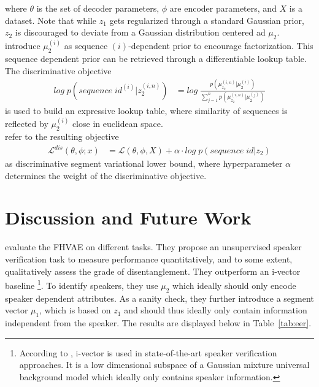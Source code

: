 \documentclass{article} %
\begin{document}
where $\theta$ is the set of decoder parameters, $\phi$ are encoder parameters, and $X$ is a dataset. Note that while $z_1$ gets regularized through a standard Gaussian prior, $z_2$ is discouraged to deviate from a Gaussian distribution centered ad $\mu_2$. \citet{hsu2017unsupervised} introduce $\mu_{2}^{(i)}$ as sequence $(i)$-dependent prior to encourage factorization. This sequence dependent prior can be retrieved through a differentiable lookup table. The discriminative objective 
\begin{align*}
log\;p(sequence\;id^{(i)} | z_2^{(i,n)})& = log\;\frac{p(\mu_{z_2}^{(i,n)}|\mu_2^{(i)})}{\sum^{n}_{j=1}	p(\mu_{z_2}^{(i,n)}|\mu_2^{(j)})}
\end{align*}
is used to build an expressive lookup table, where similarity of sequences is reflected by $\mu_{2}^{(i)}$ close in euclidean space.\\
\citet{hsu2017unsupervised} refer to the resulting objective
\begin{align*}
\mathcal{L}^{dis}(\theta, \phi;x)& = \mathcal{L}(\theta, \phi, X) + \alpha \cdot log\;p(sequence\;id | z_2)
\end{align*}
as discriminative segment variational lower bound, where hyperparameter $\alpha$ determines the weight of the discriminative objective.




\section*{Discussion and Future Work}
\citet{hsu2017unsupervised} evaluate the FHVAE on different tasks. They propose an unsupervised speaker verification task to measure performance quantitatively, and to some extent, qualitatively assess the grade of disentanglement. They outperform an i-vector baseline \footnote{According to \citet{hsu2017unsupervised}, i-vector is used in state-of-the-art speaker verification approaches. It is a low dimensional subspace of a Gaussian mixture universal background model which ideally only contains speaker information.}. To identify speakers, they use $\mu_2$ which ideally should only encode speaker dependent attributes. As a sanity check, they further introduce a segment vector $\mu_1$, which is based on $z_1$ and should thus ideally only contain information independent from the speaker. The results are displayed below in Table~\ref{tab:eer}.
\end{document}
